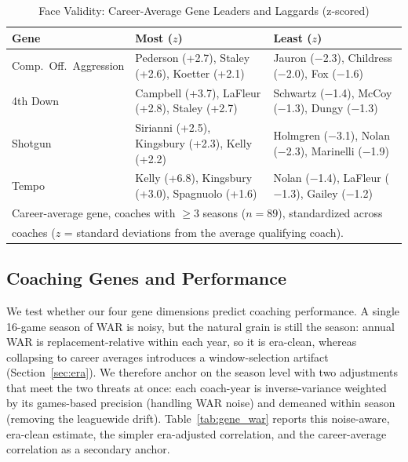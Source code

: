 \documentclass[USenglish]{article}
\theoremstyle{dgthm}
\theoremstyle{dgdef}
\begin{document}
\begin{table}[H]
\caption{Face Validity: Career-Average Gene Leaders and Laggards (z-scored)}
\label{tab:face_validity}
\scriptsize
\begin{tabular}{@{}l p{} p{}@{}}
\toprule
\textbf{Gene} & \textbf{Most ($z$)} & \textbf{Least ($z$)} \\
\midrule
Comp.\ Off.\ Aggression & Pederson (+2.7), Staley (+2.6), Koetter (+2.1) & Jauron ($-$2.3), Childress ($-$2.0), Fox ($-$1.6) \\
4th Down & Campbell (+3.7), LaFleur (+2.8), Staley (+2.7) & Schwartz ($-$1.4), McCoy ($-$1.3), Dungy ($-$1.3) \\
Shotgun & Sirianni (+2.5), Kingsbury (+2.3), Kelly (+2.2) & Holmgren ($-$3.1), Nolan ($-$2.3), Marinelli ($-$1.9) \\
Tempo & Kelly (+6.8), Kingsbury (+3.0), Spagnuolo (+1.6) & Nolan ($-$1.4), LaFleur ($-$1.3), Gailey ($-$1.2) \\
\midrule
\multicolumn{3}{l}{\small Career-average gene, coaches with $\geq 3$ seasons ($n=89$), standardized across}\\
\multicolumn{3}{l}{\small coaches ($z$ = standard deviations from the average qualifying coach).}\\
\bottomrule
\end{tabular}
\end{table}

\subsection{Coaching Genes and Performance}

We test whether our four gene dimensions predict coaching performance. A single 16-game season of WAR is noisy, but the natural grain is still the season: annual WAR is replacement-relative within each year, so it is era-clean, whereas collapsing to career averages introduces a window-selection artifact (Section~\ref{sec:era}). We therefore anchor on the season level with two adjustments that meet the two threats at once: each coach-year is inverse-variance weighted by its games-based precision (handling WAR noise) and demeaned within season (removing the leaguewide drift). Table~\ref{tab:gene_war} reports this noise-aware, era-clean estimate, the simpler era-adjusted correlation, and the career-average correlation as a secondary anchor.
\end{document}
